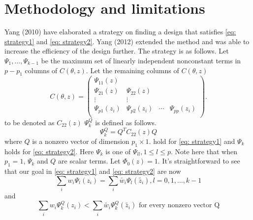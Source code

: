 \documentclass[11pt]{amsart}
\theoremstyle{definition}
\theoremstyle{remark}
\begin{document}
\section{Methodology and limitations} 

Yang (2010) have elaborated a strategy on finding a design that satisfies \eqref{eq: strategy1} and \eqref{eq: strategy2}. Yang (2012) extended the method and was able to increase the efficiency of the design further. The strategy is as follows. Let $\Psi_1,\ldots, \Psi_{k-1}$ be the maximum set of linearly independent nonconstant terms in $p-p_1$ columns of $C(\theta,z)$. Let the remaining columns of $C(\theta,z)$ \[C(\theta,z) = \left ( \begin{array}{cccc}
\Psi_{11}(z) &&&\\
\Psi_{21}(z) &\Psi_{22}(z)&&\\
\vdots & \vdots &&\\
\Psi_{p1}(z_i) &\Psi_{p2}(z_i)&\cdots&\Psi_{pp}(z_i)\\
\end{array}\right).\]to be denoted as $C_{22}(z)$ $\Psi_k^Q$ is defined as follows. 
\[\Psi_k^Q = Q^TC_{22}(z)Q\] where $Q$ is a nonzero vector of dimension $p_1\times 1$. 
hold for \eqref{eq: strategy1} and $\Psi_{k}$ holds for  \eqref{eq: strategy2}.  Here $\Psi_k$ is one of  $\Psi_{ll}, 1\le l \le p$. Note here that when $p_1=1$, $\Psi_k$ and $Q$ are scalar terms. Let $\Phi_0(z) = 1$. It's straightforward to see that our goal in \eqref{eq: strategy1} and \eqref{eq: strategy2} are now 
\begin{equation} \label{eq: st1}
\sum_{i}w_i\Psi_l(z_i)=\sum_{i}\tilde{w_i}\Psi_l(\tilde{z_i}), l=0,1,\ldots, k-1
\end{equation} and \begin{equation} \label{eq: st2}
\sum_{i}w_i\Psi_k^Q(z_i)<\sum_{i}\tilde{w_i}\Psi_k^Q(\tilde{z_i}) \text{  for every nonzero vector Q}
\end{equation} 
\end{document}
